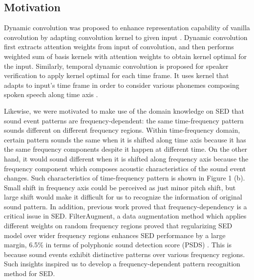 \documentclass[a4paper]{article}
\begin{document}
\subsection{Motivation}
\vspace{-5pt}
Dynamic convolution was proposed to enhance representation capability of vanilla convolution by adapting convolution kernel to given input \cite{dyconv}. Dynamic convolution first extracts attention weights from input of convolution, and then performs weighted sum of basis kernels with attention weights to obtain kernel optimal for the input. Similarly, temporal dynamic convolution is proposed for speaker verification to apply kernel optimal for each time frame. It uses kernel that adapts to input’s time frame in order to consider various phonemes composing spoken speech along time axis \cite{tdycnn}.

Likewise, we were motivated to make use of the domain knowledge on SED that sound event patterns are frequency-dependent: the same time-frequency pattern sounds different on different frequency regions. Within time-frequency domain, certain pattern sounds the same when it is shifted along time axis because it has the same frequency components despite it happen at different time. On the other hand, it would sound different when it is shifted along frequency axis because the frequency component which composes acoustic characteristics of the sound event changes. Such characteristics of time-frequency pattern is shown in Figure 1 (b). Small shift in frequency axis could be perceived as just minor pitch shift, but large shift would make it difficult for us to recognize the information of original sound pattern. In addition, previous work proved that frequency-dependency is a critical issue in SED. FilterAugment, a data augmentation method which applies different weights on random frequency regions proved that regularizing SED model over wider frequency regions enhances SED performance by a large margin, 6.5\% in terms of polyphonic sound detection score (PSDS) \cite{filtaug, PSDS}. This is because sound events exhibit distinctive patterns over various frequency regions. Such insights inspired us to develop a frequency-dependent pattern recognition method for SED.
\end{document}
